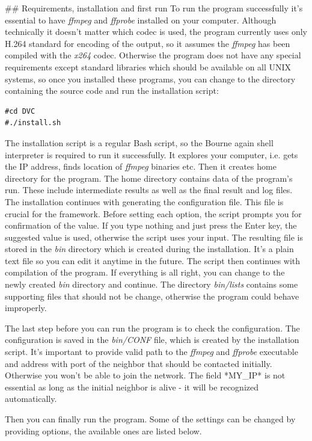 ## Requirements, installation and first run
To run the program successfully it's essential to have \textit{ffmpeg} and \textit{ffprobe} installed on your computer. Although technically it doesn't matter which codec is used, the program currently uses only H.264 standard for encoding of the output, so it assumes the \textit{ffmpeg} has been compiled with the \textit{x264} codec. Otherwise the program does not have any special requirements except standard libraries which should be available on all UNIX systems, so once you installed these programs, you can change to the directory containing the source code and run the installation script:
\begin{verbatim}
#cd DVC
#./install.sh
\end{verbatim}
The installation script is a regular Bash script, so the Bourne again shell interpreter is required to run it successfully. It explores your computer, i.e. gets the IP address, finds location of \textit{ffmpeg} binaries etc. Then it creates home directory for the program. The home directory contains data of the program's run. These include intermediate results as well as the final result and log files. The installation continues with generating the configuration file. This file is crucial for the framework. Before setting each option, the script prompts you for confirmation of the value. If you type nothing and just press the Enter key, the suggested value is used, otherwise the script uses your input. The resulting file is stored in the \textit{bin} directory which is created during the installation. It's a plain text file so you can edit it anytime in the future. The script then continues with compilation of the program. If everything is all right, you can change to the newly created \textit{bin} directory and continue. The directory \textit{bin/lists} contains some supporting files that should not be change, otherwise the program could behave improperly.

The last step before you can run the program is to check the configuration. The configuration is saved in the \textit{bin/CONF} file, which is created by the installation script. It's important to provide valid path to the \textit{ffmpeg} and \textit{ffprobe} executable and address with port of the neighbor that should be contacted initially. Otherwise you won't be able to join the network. The field *MY_IP* is not essential as long as the initial neighbor is alive - it will be recognized automatically. 

Then you can finally run the program. Some of the settings can be changed by providing options, the available ones are listed below. \pagebreak

